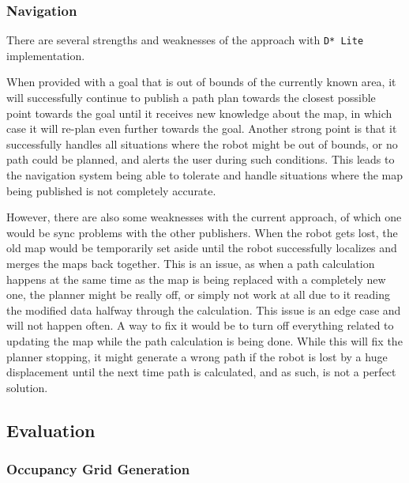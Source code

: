 \documentclass[10pt,english]{article}
\begin{document}
\subsubsection*{Navigation}

There are several strengths and weaknesses of the approach with \texttt{D* Lite} implementation.

When provided with a goal that is out of bounds of the currently known area, it will successfully continue to publish a path plan towards the closest possible point towards the goal until it receives new knowledge about the map, in which case it will re-plan even further towards the goal. Another strong point is that it successfully handles all situations where the robot might be out of bounds, or no path could be planned, and alerts the user during such conditions. This leads to the navigation system being able to tolerate and handle situations where the map being published is not completely accurate.

However, there are also some weaknesses with the current approach, of which one would be sync problems with the other publishers. When the robot gets lost, the old map would be temporarily set aside until the robot successfully localizes and merges the maps back together. This is an issue, as when a path calculation happens at the same time as the map is being replaced with a completely new one, the planner might be really off, or simply not work at all due to it reading the modified data halfway through the calculation. This issue is an edge case and will not happen often. A way to fix it would be to turn off everything related to updating the map while the path calculation is being done. While this will fix the planner stopping, it might generate a wrong path if the robot is lost by a huge displacement until the next time path is calculated, and as such, is not a perfect solution.

\clearpage

\subsection*{Evaluation}


\subsubsection*{Occupancy Grid Generation}
\end{document}
